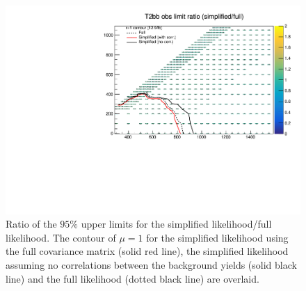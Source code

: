 \begin{figure}[hbt]
  \begin{center} 
   \includegraphics[width=1.5\cmsFigWidth]{figures/alphaT/full_T2bb_obs}
   \caption{Ratio of the $95\%$ upper limits for the simplified likelihood/full likelihood.
   The contour of $\mu=1$ for the simplified likelihood using the full covariance matrix (solid red line), 
   the simplified likelihood assuming no correlations between the background yields (solid black line) and the full
   likelihood (dotted black line) are overlaid.
   }
   \label{fig:limitPlanes} 
  \end{center}
\end{figure}







